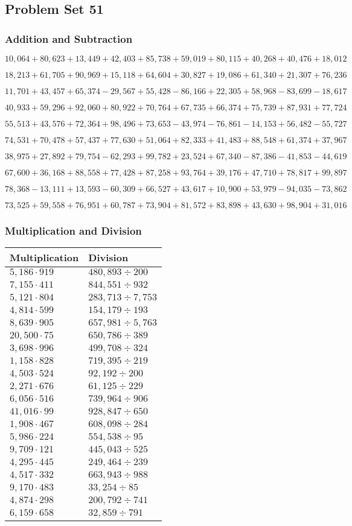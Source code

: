 \hypertarget{problem-set-51-3}{%
\subsection{Problem Set 51}\label{problem-set-51-3}}

\hypertarget{addition-and-subtraction-273}{%
\subsubsection{Addition and
Subtraction}\label{addition-and-subtraction-273}}

\(10,064+80,623+13,449+42,403+85,738+59,019+80,115+40,268+40,476+ 18,012\)

\(18,213+61,705+90,969+15,118+64,604+30,827+19,086+61,340+21,307+76,236\)

\(11,701+43,457+65,374-29,567+55,428-86,166+22,305+58,968-83,699-18,617\)

\(40,933+59,296+92,060+80,922+70,764+67,735+66,374+75,739+87,931+77,724\)

\(55,513+43,576+72,364+98,496+73,653-43,974-76,861-14,153+56,482-55,727\)

\(74,531+70,478+57,437+77,630+51,064+82,333+41,483+88,548+61,374+37,967\)

\(38,975+27,892+79,754-62,293+99,782+23,524+67,340-87,386-41,853-44,619\)

\(67,600+36,168+88,558+77,428+87,258+93,764+39,176+47,710+78,817+99,897\)

\(78,368-13,111+13,593-60,309+66,527+43,617+10,900+53,979-94,035-73,862\)

\(73,525+59,558+76,951+60,787+73,904+81,572+83,898+43,630+98,904+31,016\)

\hypertarget{multiplication-and-division-272}{%
\subsubsection{Multiplication and
Division}\label{multiplication-and-division-272}}

\begin{longtable}[]{@{}ll@{}}
\toprule
Multiplication & Division\tabularnewline
\midrule
\endhead
\(5,186\cdot919\) & \(480,893÷200\)\tabularnewline
\(7,155\cdot411\) & \(844,551÷932\)\tabularnewline
\(5,121\cdot804\) & \(283,713÷7,753\)\tabularnewline
\(4,814\cdot599\) & \(154,179÷193\)\tabularnewline
\(8,639\cdot905\) & \(657,981÷5,763\)\tabularnewline
\(20,500\cdot75\) & \(650,786÷389\)\tabularnewline
\(3,698\cdot996\) & \(499,708÷324\)\tabularnewline
\(1,158\cdot828\) & \(719,395÷219\)\tabularnewline
\(4,503\cdot524\) & \(92,192÷200\)\tabularnewline
\(2,271\cdot676\) & \(61,125÷229\)\tabularnewline
\(6,056\cdot516\) & \(739,964÷906\)\tabularnewline
\(41,016\cdot99\) & \(928,847÷650\)\tabularnewline
\(1,908\cdot467\) & \(608,098÷284\)\tabularnewline
\(5,986\cdot224\) & \(554,538÷95\)\tabularnewline
\(9,709\cdot121\) & \(445,043÷525\)\tabularnewline
\(4,295\cdot445\) & \(249,464÷239\)\tabularnewline
\(4,517\cdot332\) & \(663,943÷988\)\tabularnewline
\(9,170\cdot483\) & \(33,254÷85\)\tabularnewline
\(4,874\cdot298\) & \(200,792÷741\)\tabularnewline
\(6,159\cdot658\) & \(32,859÷791\)\tabularnewline
\bottomrule
\end{longtable}

